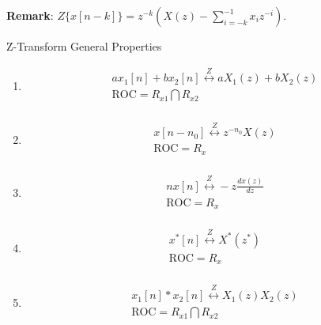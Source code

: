 \textbf{Remark}: $Z\{ x[n - k] \} = z^{-k}(X(z) - \sum\limits_{i=-k}^{-1} x_i z^{-i}) $.

Z-Transform General Properties

\begin{enumerate}
\item 
\begin{equation}
    \begin{gathered}
        a{x_1}[n] + b{x_2}[n]\overset Z \longleftrightarrow a{X_1}(z) + b{X_2}(z) \\ 
        {\text{ROC}} = {R_{x1}}\bigcap {{R_{x2}}}  \\ 
      \end{gathered} 
\end{equation}

\item 
\begin{equation}
    \begin{gathered}
        x[n - {n_0}]\overset Z \longleftrightarrow {z^{ - {n_0}}}X(z) \\ 
        {\text{ROC}} = {R_x} \\ 
      \end{gathered} 
\end{equation}

\item 
\begin{equation}
\begin{gathered}
    nx[n]\overset Z \longleftrightarrow  - z\frac{{dx(z)}}{{dz}} \\ 
    {\text{ROC}} = {R_x} \\ 
  \end{gathered} 
\end{equation}

\item 
\begin{equation}
    \begin{gathered}
        {x^*}[n]\overset Z \longleftrightarrow {X^*}({z^*}) \\ 
        {\text{ROC}} = {R_x} \\ 
      \end{gathered} 
\end{equation}

\item 
\begin{equation}
    \begin{gathered}
        {x_1}[n] * {x_2}[n]\overset Z \longleftrightarrow {X_1}(z){X_2}(z) \\ 
        {\text{ROC}} = {R_{x1}}\bigcap {{R_{x2}}}  \\ 
      \end{gathered} 
\end{equation}


\end{enumerate}
